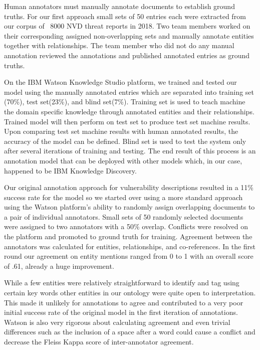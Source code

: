 \documentclass{article} %
\begin{document}
Human annotators must manually annotate documents to establish ground truths.  For our first approach small sets of 50 entries each were extracted from our corpus of ~8000 NVD threat reports in 2018.  Two team members worked on their corresponding assigned non-overlapping sets and manually annotate entities together with relationships. The team member who did not do any manual annotation reviewed the annotations and published annotated entries as ground truths.  

On the IBM Watson Knowledge Studio platform, we trained and tested our model using the manually annotated entries which are separated into training set (70\%), test set(23\%), and blind set(7\%). Training set is used to teach machine the domain specific knowledge through annotated entities and their relationships. Trained model will then perform on test set to produce test set machine results. Upon comparing test set machine results with human annotated results, the accuracy of the model can be defined. Blind set is used to test the system only after several iterations of training and testing. The end result of this process is an annotation model that can be deployed with other models which, in our case, happened to be IBM Knowledge Discovery.

Our original annotation approach for vulnerability descriptions resulted in a 11\% success rate for the model so we started over using a more standard approach using the Watson platform's ability to randomly assign overlapping documents to a pair of individual annotators.  Small sets of 50 randomly selected documents were assigned to two annotators with a 50\% overlap.  Conflicts were resolved on the platform and promoted to ground truth for training.  Agreement between the annotators was calculated for entities, relationships, and co-references.  In the first round our agreement on entity mentions ranged from 0 to 1 with an overall score of .61, already a huge improvement.

While a few entities were relatively straightforward to identify and tag using certain key words other entities in our ontology were quite open to interpretation.  This made it unlikely for annotations to agree and contributed to a very poor initial success rate of the original model in the first iteration of annotations.  Watson is also very rigorous about calculating agreement and even trivial differences such as the inclusion of a space after a word could cause a conflict and decrease the Fleiss Kappa score of inter-annotator agreement.  
\end{document}
